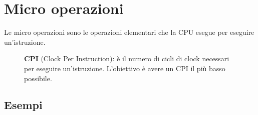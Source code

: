 \documentclass[a4paper]{article}
\theoremstyle{break}
\theoremstyle{break}
\theoremstyle{break}
\theoremstyle{break}
\begin{document}
\section{Micro operazioni}
Le micro operazioni sono le operazioni elementari che la CPU esegue per eseguire
un'istruzione.

\begin{figure}[H]
	\begin{define}
		\textbf{CPI} (Clock Per Instruction): è il numero di cicli di clock necessari per
		eseguire un'istruzione. L'obiettivo è avere un CPI il più basso possibile.
	\end{define}
\end{figure}

\subsection{Esempi}
\end{document}
